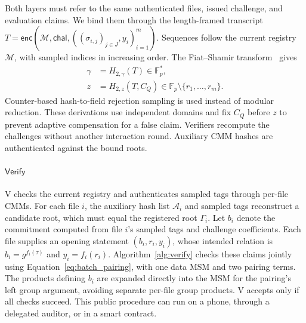 \documentclass[lettersize,journal]{IEEEtran}
\newcommand{\FF}{\mathbb{F}}
\newcommand{\Verify}{\ensuremath{\mathsf{Verify}}}
\begin{document}
Both layers must refer to the same authenticated files, issued challenge, and evaluation claims. We bind them through the length-framed transcript
$T=\mathsf{enc}(\mathcal M,\mathsf{chal},((\sigma_{i,j})_{j\in J},y_i)_{i=1}^m).$
Sequences follow the current registry $\mathcal M$, with sampled indices in increasing order. The Fiat--Shamir transform~\cite{FiatShamir1987} gives
\begin{equation}\label{eq:batch_challenges}
\begin{aligned}
\gamma&=H_{2,\gamma}(T)\in\FF_p^*,\\
z&=H_{2,z}(T,C_Q)\in\FF_p\setminus\{r_1,\ldots,r_m\}.
\end{aligned}
\end{equation}
Counter-based hash-to-field rejection sampling is used instead of modular reduction. These derivations use independent domains and fix $C_Q$ before $z$ to prevent adaptive compensation for a false claim. Verifiers recompute the challenges without another interaction round. Auxiliary CMM hashes are authenticated against the bound roots.

\paragraph{\textbf{\Verify{}}}
V checks the current registry and authenticates sampled tags through per-file CMMs. For each file $i$, the auxiliary hash list $\mathcal A_i$ and sampled tags reconstruct a candidate root, which must equal the registered root $\Gamma_i$. Let $b_i$ denote the commitment computed from file $i$'s sampled tags and challenge coefficients. Each file supplies an opening statement $(b_i,r_i,y_i)$, whose intended relation is $b_i=g^{f_i(\tau)}$ and $y_i=f_i(r_i)$. Algorithm~\ref{alg:verify} checks these claims jointly using Equation~\eqref{eq:batch_pairing}, with one data MSM and two pairing terms. The products defining $b_i$ are expanded directly into the MSM for the pairing's left group argument, avoiding separate per-file group products. V accepts only if all checks succeed. This public procedure can run on a phone, through a delegated auditor, or in a smart contract.
\end{document}
